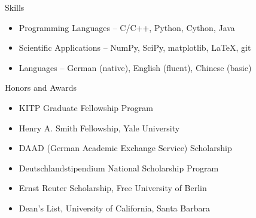 \documentclass[11pt]{resume} %
\begin{document}
\begin{rSection}{Skills}
  \begin{itemize}[leftmargin=1.0cm, topsep=0pt,itemsep=0pt,partopsep=0pt, parsep=0pt]
    \item Programming Languages – C/C++, Python, Cython, Java
    \item Scientific Applications – NumPy, SciPy, matplotlib, LaTeX, git
    \item Languages – German (native), English (fluent), Chinese (basic)
  \end{itemize}
\end{rSection}

\begin{rSection}{Honors and Awards}
  \begin{itemize}[leftmargin=1.0cm, topsep=0pt,itemsep=0pt,partopsep=0pt, parsep=0pt]
    \item KITP Graduate Fellowship Program
    \item Henry A. Smith Fellowship, Yale University
    \item DAAD (German Academic Exchange Service) Scholarship
    \item Deutschlandstipendium National Scholarship Program
    \item Ernst Reuter Scholarship, Free University of Berlin
    \item Dean's List, University of California, Santa Barbara
  \end{itemize}
\end{rSection}
\end{document}
